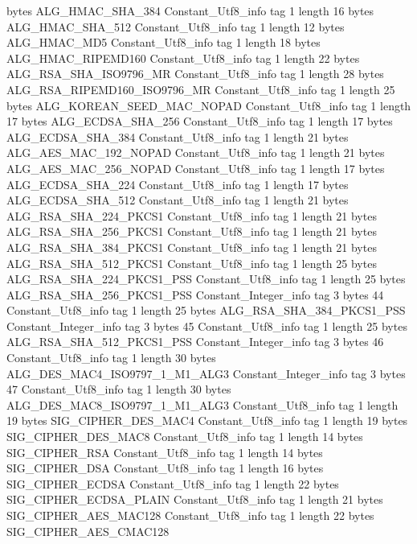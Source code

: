 {{{			bytes	ALG_HMAC_SHA_384
		}
		Constant_Utf8_info {
			tag	1
			length	16
			bytes	ALG_HMAC_SHA_512
		}
		Constant_Utf8_info {
			tag	1
			length	12
			bytes	ALG_HMAC_MD5
		}
		Constant_Utf8_info {
			tag	1
			length	18
			bytes	ALG_HMAC_RIPEMD160
		}
		Constant_Utf8_info {
			tag	1
			length	22
			bytes	ALG_RSA_SHA_ISO9796_MR
		}
		Constant_Utf8_info {
			tag	1
			length	28
			bytes	ALG_RSA_RIPEMD160_ISO9796_MR
		}
		Constant_Utf8_info {
			tag	1
			length	25
			bytes	ALG_KOREAN_SEED_MAC_NOPAD
		}
		Constant_Utf8_info {
			tag	1
			length	17
			bytes	ALG_ECDSA_SHA_256
		}
		Constant_Utf8_info {
			tag	1
			length	17
			bytes	ALG_ECDSA_SHA_384
		}
		Constant_Utf8_info {
			tag	1
			length	21
			bytes	ALG_AES_MAC_192_NOPAD
		}
		Constant_Utf8_info {
			tag	1
			length	21
			bytes	ALG_AES_MAC_256_NOPAD
		}
		Constant_Utf8_info {
			tag	1
			length	17
			bytes	ALG_ECDSA_SHA_224
		}
		Constant_Utf8_info {
			tag	1
			length	17
			bytes	ALG_ECDSA_SHA_512
		}
		Constant_Utf8_info {
			tag	1
			length	21
			bytes	ALG_RSA_SHA_224_PKCS1
		}
		Constant_Utf8_info {
			tag	1
			length	21
			bytes	ALG_RSA_SHA_256_PKCS1
		}
		Constant_Utf8_info {
			tag	1
			length	21
			bytes	ALG_RSA_SHA_384_PKCS1
		}
		Constant_Utf8_info {
			tag	1
			length	21
			bytes	ALG_RSA_SHA_512_PKCS1
		}
		Constant_Utf8_info {
			tag	1
			length	25
			bytes	ALG_RSA_SHA_224_PKCS1_PSS
		}
		Constant_Utf8_info {
			tag	1
			length	25
			bytes	ALG_RSA_SHA_256_PKCS1_PSS
		}
		Constant_Integer_info {
			tag	3
			bytes	44
		}
		Constant_Utf8_info {
			tag	1
			length	25
			bytes	ALG_RSA_SHA_384_PKCS1_PSS
		}
		Constant_Integer_info {
			tag	3
			bytes	45
		}
		Constant_Utf8_info {
			tag	1
			length	25
			bytes	ALG_RSA_SHA_512_PKCS1_PSS
		}
		Constant_Integer_info {
			tag	3
			bytes	46
		}
		Constant_Utf8_info {
			tag	1
			length	30
			bytes	ALG_DES_MAC4_ISO9797_1_M1_ALG3
		}
		Constant_Integer_info {
			tag	3
			bytes	47
		}
		Constant_Utf8_info {
			tag	1
			length	30
			bytes	ALG_DES_MAC8_ISO9797_1_M1_ALG3
		}
		Constant_Utf8_info {
			tag	1
			length	19
			bytes	SIG_CIPHER_DES_MAC4
		}
		Constant_Utf8_info {
			tag	1
			length	19
			bytes	SIG_CIPHER_DES_MAC8
		}
		Constant_Utf8_info {
			tag	1
			length	14
			bytes	SIG_CIPHER_RSA
		}
		Constant_Utf8_info {
			tag	1
			length	14
			bytes	SIG_CIPHER_DSA
		}
		Constant_Utf8_info {
			tag	1
			length	16
			bytes	SIG_CIPHER_ECDSA
		}
		Constant_Utf8_info {
			tag	1
			length	22
			bytes	SIG_CIPHER_ECDSA_PLAIN
		}
		Constant_Utf8_info {
			tag	1
			length	21
			bytes	SIG_CIPHER_AES_MAC128
		}
		Constant_Utf8_info {
			tag	1
			length	22
			bytes	SIG_CIPHER_AES_CMAC128
}}}
